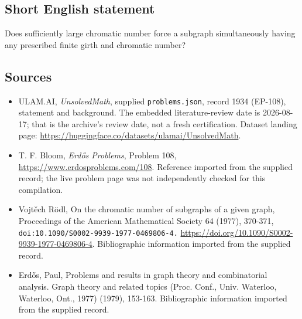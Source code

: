 \documentclass[11pt,a4paper]{article}
\begin{document}
\subsection{Short English statement}

Does sufficiently large chromatic number force a subgraph simultaneously having any prescribed finite girth and chromatic number?

\subsection{Sources}

{\small

\begin{itemize}

\item[\hypertarget{source:1934:1}{S1}] ULAM.AI, \emph{UnsolvedMath}, supplied \texttt{problems.json}, record 1934 (EP-108), statement and background. The embedded literature-review date is 2026-08-17; that is the archive’s review date, not a fresh certification. Dataset landing page: \url{https://huggingface.co/datasets/ulamai/UnsolvedMath}.

\item[\hypertarget{source:1934:2}{S2}] T. F. Bloom, \emph{Erdős Problems}, Problem 108, \url{https://www.erdosproblems.com/108}. Reference imported from the supplied record; the live problem page was not independently checked for this compilation.

\item[\hypertarget{source:1934:3}{S3}] Vojtěch Rödl, On the chromatic number of subgraphs of a given graph, Proceedings of the American Mathematical Society 64 (1977), 370-371, \nolinkurl{doi:10.1090/S0002-9939-1977-0469806-4.} \url{https://doi.org/10.1090/S0002-9939-1977-0469806-4}. Bibliographic information imported from the supplied record.

\item[\hypertarget{source:1934:4}{S4}] Erd\H{o}s, Paul, Problems and results in graph theory and combinatorial analysis. Graph theory and related topics (Proc. Conf., Univ. Waterloo, Waterloo, Ont., 1977) (1979), 153-163. Bibliographic information imported from the supplied record.

\end{itemize}

}

\label{end:1934}
\end{document}
